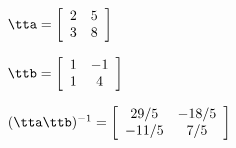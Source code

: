 {$\tta = \left[
\begin{array}{cc}
 2 & 5 \\
 3 & 8 
\end{array}\right]$
 
$\ttb = \left[
\begin{array}{cc}
 1 & -1 \\
 1 & 4
\end{array}
\right]$}
{$(\tta\ttb)^{-1} = \left[
\begin{array}{cc}
  29/5 & -18/5 \\
  -11/5 & 7/5
\end{array}
\right]$}
